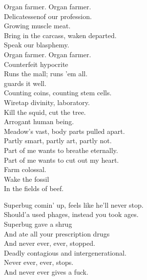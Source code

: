 Organ farmer. Organ farmer. \\

Delicatessenof our profession. \\
Growing muscle meat. \\
Bring in the carcass, waken departed. \\
Speak our blasphemy. \\

Organ farmer. Organ farmer. \\

Counterfeit hypocrite \\
Runs the mall; runs 'em all. \\
 guards it well. \\
Counting coins, counting stem cells. \\
Wiretap divinity,  laboratory. \\

Kill the squid, cut the tree. \\
Arrogant human being. \\
Meadow's vast, body parts pulled apart. \\
Partly smart, partly art, partly not. \\
Part of me wants to breathe eternally. \\
Part of me wants to cut out my heart. \\

Farm colossal. \\
Wake the fossil \\
In the fields of beef. \\





Superbug comin' up, feels like he'll never stop. \\
Should'a used phages, instead you took ages. \\
Superbug gave a shrug \\
And ate all your prescription drugs \\
And never ever, ever, stopped. \\

Deadly contagious and intergenerational. \\
Never ever, ever, stops. \\
And never ever gives a fuck. \\

